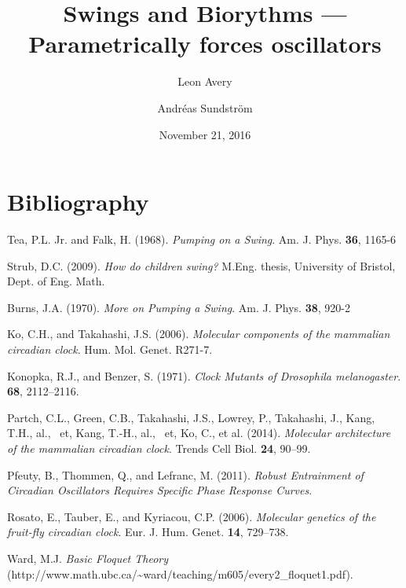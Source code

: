\documentclass[11pt,letter, english,%
]{article}
\begin{document}

\title{\vspace{-1cm}Swings and Biorythms --- Parametrically forces oscillators}
\author{Leon Avery \and Andréas Sundstr{\"o}m}
\date{November 21, 2016}

\maketitle

\begin{abstract}
\end{abstract}









\section*{Bibliography}
Tea, P.L. Jr. and Falk, H. (1968). \textit{Pumping on a Swing}. Am. J. Phys. 
\textbf{36}, 1165-6

\bigskip\noindent
Strub, D.C. (2009). \textit{How do children swing?}  M.Eng. thesis, University
of Bristol, Dept. of Eng. Math.%

\bigskip\noindent
Burns, J.A. (1970). \textit{More on Pumping a Swing}. Am. J. Phys. \textbf{38}, 920-2

\bigskip\noindent
Ko, C.H., and Takahashi, J.S. (2006). \textit{Molecular components of the
mammalian circadian clock}. Hum. Mol. Genet. R271-7.

\bigskip\noindent
Konopka, R.J., and Benzer, S. (1971). \textit{Clock Mutants of Drosophila
melanogaster}. \textbf{68}, 2112–2116.

\bigskip\noindent{}
Partch, C.L., Green, C.B., Takahashi, J.S., Lowrey, P., Takahashi, J.,
Kang, T.H., al., \ et, Kang, T.-H., al., \ et, Ko, C., et al. (2014).
\textit{Molecular architecture of the mammalian circadian clock}. Trends Cell
Biol. \textbf{24}, 90–99.

\bigskip\noindent
Pfeuty, B., Thommen, Q., and Lefranc, M. (2011). \textit{Robust Entrainment of
Circadian Oscillators Requires Specific Phase Response Curves}.

\bigskip\noindent
Rosato, E., Tauber, E., and Kyriacou, C.P. (2006). \textit{Molecular genetics
of the fruit-fly circadian clock}. Eur. J. Hum. Genet. \textbf{14},
729–738.

\bigskip\noindent
Ward, M.J. \textit{Basic Floquet Theory}
(http://www.math.ubc.ca/\~{}ward/teaching/m605/every2\_floquet1.pdf).
\end{document}
